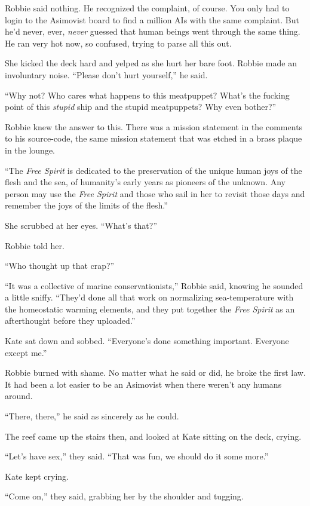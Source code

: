 Robbie said nothing. He recognized the complaint, of course. You
only had to login to the Asimovist board to find a million AIs with
the same complaint. But he’d never, ever, \emph{never} guessed that
human beings went through the same thing. He ran very hot now, so
confused, trying to parse all this out.

She kicked the deck hard and yelped as she hurt her bare foot.
Robbie made an involuntary noise. “Please don’t hurt yourself,” he
said.

“Why not? Who cares what happens to this meatpuppet? What’s the
fucking point of this \emph{stupid} ship and the stupid
meatpuppets? Why even bother?”

Robbie knew the answer to this. There was a mission statement in
the comments to his source-code, the same mission statement that
was etched in a brass plaque in the lounge.

“The \emph{Free Spirit} is dedicated to the preservation of the
unique human joys of the flesh and the sea, of humanity’s early
years as pioneers of the unknown. Any person may use the
\emph{Free Spirit} and those who sail in her to revisit those days
and remember the joys of the limits of the flesh.”

She scrubbed at her eyes. “What’s that?”

Robbie told her.

“Who thought up that crap?”

“It was a collective of marine conservationists,” Robbie said,
knowing he sounded a little sniffy. “They’d done all that work on
normalizing sea-temperature with the homeostatic warming elements,
and they put together the \emph{Free Spirit} as an afterthought
before they uploaded.”

Kate sat down and sobbed. “Everyone’s done something important.
Everyone except me.”

Robbie burned with shame. No matter what he said or did, he broke
the first law. It had been a lot easier to be an Asimovist when
there weren’t any humans around.

“There, there,” he said as sincerely as he could.

The reef came up the stairs then, and looked at Kate sitting on the
deck, crying.

“Let’s have sex,” they said. “That was fun, we should do it some
more.”

Kate kept crying.

“Come on,” they said, grabbing her by the shoulder and tugging.

